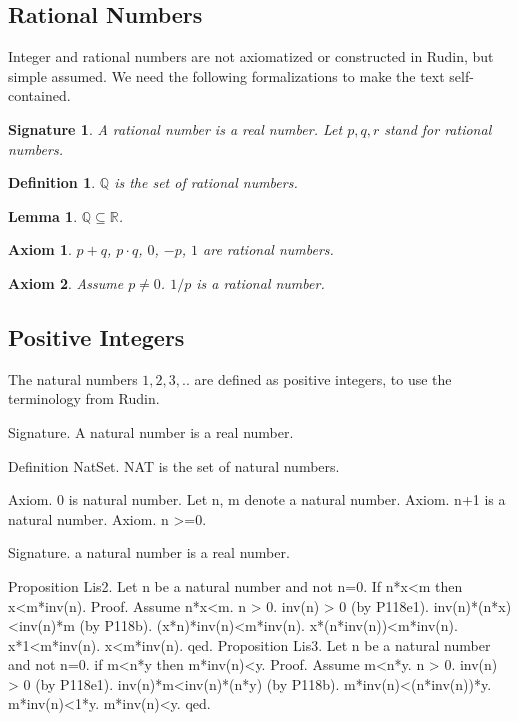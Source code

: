 \documentclass{article}
\newenvironment{forthel}{\begin{leftbar}}{\end{leftbar}}
\newtheorem{axiom}{Axiom}
\newtheorem{lemma}{Lemma}
\newtheorem{definition}{Definition}
\newtheorem{signature}{Signature}
\newcommand{\RR}{\mathbb{R}}
\newcommand{\QQ}{\mathbb{Q}}
\begin{document}
\subsection{Rational Numbers}
Integer and rational numbers are not axiomatized or constructed in Rudin, but simple assumed. We need the following formalizations to make the text self-contained.

\begin{forthel}

\begin{signature} A \emph{rational number} is a real number.
Let $p,q,r$ stand for rational numbers.\end{signature}

\begin{definition} $\QQ$ is the set of rational numbers.
\end{definition}


\begin{lemma} $\QQ \subseteq \RR$.\end{lemma}

\begin{axiom} $p + q$, $p \cdot q$, $0$, $-p$, $1$ are 
rational numbers.\end{axiom}

\begin{axiom} Assume $p \neq 0$. $1/p$ is a rational number.
\end{axiom}

\end{forthel}




\subsection{Positive Integers}
The natural numbers $1,2,3,..$ are defined as positive integers, to use the terminology from Rudin.
\begin{forthel}
	Signature. A natural number is a real number.
	
	Definition NatSet.
	NAT is the set of natural numbers.
	
	Axiom. 0 is natural number.
	Let n, m denote a natural number.
	Axiom. n+1 is a natural number.
	Axiom. n >=0.
	
	Signature. a natural number is a real number.
	
	

	
	Proposition Lis2. Let n be a natural number and not n=0. If n*x<m then x<m*inv(n).
	Proof.
	Assume n*x<m.
	n > 0.
	inv(n) > 0 (by P118e1).
	inv(n)*(n*x)<inv(n)*m (by P118b).
	(x*n)*inv(n)<m*inv(n).
	x*(n*inv(n))<m*inv(n).
	x*1<m*inv(n).
	x<m*inv(n).
	qed.
	Proposition Lis3. Let n be a natural number and not n=0. if m<n*y then m*inv(n)<y.
	Proof.
	Assume m<n*y.
	n > 0.
	inv(n) > 0 (by P118e1).
	inv(n)*m<inv(n)*(n*y) (by P118b).
	m*inv(n)<(n*inv(n))*y.
	m*inv(n)<1*y.
	m*inv(n)<y.
	qed.
\end{forthel}
\end{document}
